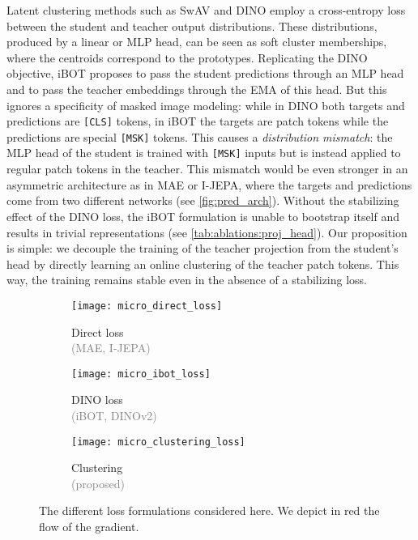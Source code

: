 Latent clustering methods such as SwAV and DINO employ a cross-entropy loss between the student and teacher output distributions.
These distributions, produced by a linear or MLP head, can be seen as soft cluster memberships, where the centroids correspond to the prototypes.
Replicating the DINO objective, iBOT proposes to pass the student predictions through an MLP head and to pass the teacher embeddings through the EMA of this head.
But this ignores a specificity of masked image modeling: while in DINO both targets and predictions are \texttt{[CLS]} tokens, in iBOT the targets are patch tokens while the predictions are special \texttt{[MSK]} tokens.
This causes a \emph{distribution mismatch}: the MLP head of the student is trained with \texttt{[MSK]} inputs but is instead applied to regular patch tokens in the teacher.
This mismatch would be even stronger in an asymmetric architecture as in MAE or I-JEPA, where the targets and predictions come from two different networks (see \cref{fig:pred_arch}).
Without the stabilizing effect of the DINO loss, the iBOT formulation is unable to bootstrap itself and results in trivial representations (see \cref{tab:ablations:proj_head}).
Our proposition is simple: we decouple the training of the teacher projection from the student's head by directly learning an online clustering of the teacher patch tokens.
This way, the training remains stable even in the absence of a stabilizing loss.


\captionsetup[subfigure]{justification=centering}
\begin{figure}[t]
\begin{subfigure}[b]{0.32\linewidth}
  \centering
  \texttt{[image: micro\_direct\_loss]}
    \caption{Direct loss\\\textcolor{gray}{(MAE, I-JEPA)}}
    \label{fig:loss_formulation:direct}
\end{subfigure}
\hfill
\begin{subfigure}[b]{0.32\linewidth}
  \centering
  \texttt{[image: micro\_ibot\_loss]}
    \caption{DINO loss\\\textcolor{gray}{(iBOT, DINOv2)}}
    \label{fig:loss_formulation:dino}
\end{subfigure}
\hfill
\begin{subfigure}[b]{0.32\linewidth}
  \centering
  \texttt{[image: micro\_clustering\_loss]}
    \caption{Clustering\\\textcolor{gray}{(proposed)}}
    \label{fig:loss_formulation:clustering}
\end{subfigure}
\caption{
  The different loss formulations considered here. 
  We depict in red the flow of the gradient.
  }
  \label{fig:loss_formulation}
\end{figure}

